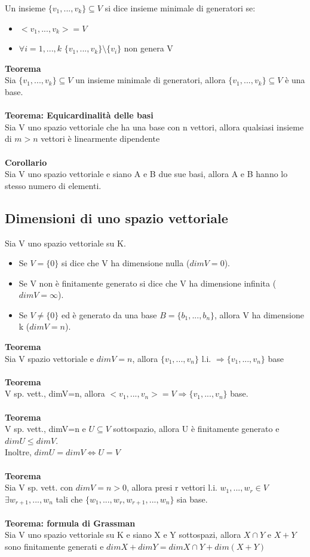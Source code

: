 \documentclass{article}
\begin{document}
Un insieme $\{v_1,...,v_k\}\subseteq V$ si dice insieme minimale di generatori se:
\begin{itemize}
    \item $<v_1,...,v_k>=V$
    \item $\forall i=1,...,k$ $\{v_1,...,v_k\}\setminus \{v_i\}$ non genera V
\end{itemize}
\textbf{Teorema}\\
Sia $\{v_1,...,v_k\}\subseteq V$ un insieme minimale di generatori, allora $\{v_1,...,v_k\}\subseteq V$ è una base.\\\\
\textbf{Teorema: Equicardinalità delle basi}\\
Sia V uno spazio vettoriale che ha una base con n vettori, allora qualsiasi insieme di $m>n$ vettori è linearmente dipendente\\\\
\textbf{Corollario}\\
Sia V uno spazio vettoriale e siano A e B due sue basi, allora A e B hanno lo stesso numero di elementi.

\subsection{Dimensioni di uno spazio vettoriale}
Sia V uno spazio vettoriale su K.
\begin{itemize}
    \item Se $V=\{0\}$ si dice che V ha dimensione nulla ($dimV=0$).
    \item Se V non è finitamente generato si dice che V ha dimensione infinita ($dimV=\infty$).
    \item Se $V\neq\{0\}$ ed è generato da una base $B=\{b_1,...,b_n\}$, allora V ha dimensione k ($dimV=n$).
\end{itemize}
\textbf{Teorema}\\
Sia V spazio vettoriale e $dimV=n$, allora $\{v_1,...,v_n\}$ l.i. $\Rightarrow \{v_1,...,v_n\}$ base\\\\
\textbf{Teorema}\\
V sp. vett., dimV=n, allora $<v_1,...,v_n>=V\Rightarrow\{v_1,...,v_n\}$ base.\\\\
\textbf{Teorema}\\
V sp. vett., dimV=n e $U\subseteq V$ sottospazio, allora U è finitamente generato e $dimU\leq dimV$.\\
Inoltre, $dimU=dimV\Leftrightarrow U=V$\\\\
\textbf{Teorema}\\
Sia V sp. vett. con $dimV=n>0$, allora presi r vettori l.i. $w_1,...,w_r\in V$ $\exists w_{r+1},...,w_n$ tali che $\{w_1,...,w_r,w_{r+1},...,w_n\}$ sia base.\\\\
\textbf{Teorema: formula di Grassman}\\
Sia V uno spazio vettoriale su K e siano X e Y sottospazi, allora $X\cap Y$ e $X+Y$ sono finitamente generati e $dimX+dimY=dimX\cap Y+dim(X+Y)$
\end{document}
